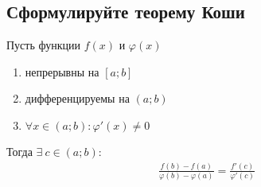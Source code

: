 \subsection{Сформулируйте теорему Коши}
\begin{theorem}
	Пусть функции $f(x)$ и $\varphi (x)$
	\begin{enumerate}
		\item непрерывны на $[a;b]$
		\item дифференцируемы на $(a;b)$
		\item $\forall x \in (a;b)\colon \varphi' (x) \ne 0$
	\end{enumerate}
	Тогда $\exists\ c \in (a;b)\colon$ \vspace{-\topsep}
	\begin{gather*}
		\boxed{\frac{f(b) - f(a)}{\varphi (b) - \varphi (a)} = \frac{f'(c)}{\varphi'(c)}}
	\end{gather*}
\end{theorem}



